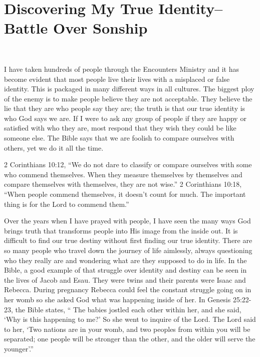 \documentclass[oneside]{book}
\begin{document}
\chapter{Discovering My True Identity--Battle Over Sonship}
\

I have taken hundreds of people through the Encounters Ministry and it has become evident that most people live their lives with a misplaced or false identity. This is packaged in many different ways in all cultures. The biggest ploy of the enemy is to make people believe they are not acceptable. They believe the lie that they are who people say they are; the truth is that our true identity is who God says we are. If I were to ask any group of people if they are happy or satisfied with who they are, most respond that they wish they could be like someone else. The Bible says that we are foolish to compare ourselves with others, yet we do it all the time.

2 Corinthians 10:12, “We do not dare to classify or compare ourselves with some who commend themselves. When they measure themselves by themselves and compare themselves with themselves, they are not wise.”
2 Corinthians 10:18, “When people commend themselves, it doesn't count for much. The important thing is for the Lord to commend them.”

Over the years when I have prayed with people, I have seen the many ways God brings truth that transforms people into His image from the inside out. It is difficult to find our true destiny without first finding our true identity. There are so many people who travel down the journey of life aimlessly, always questioning who they really are and wondering what are they supposed to do in life. In the Bible, a good example of that struggle over identity and destiny can be seen in the lives of Jacob and Esau. They were twins and their parents were Isaac and Rebecca. During pregnancy Rebecca could feel the constant struggle going on in her womb so she asked God what was happening inside of her. In Genesis 25:22-23, the Bible states, “ The babies jostled each other within her, and she said, ‘Why is this happening to me?’ So she went to inquire of the Lord. The Lord said to her, ‘Two nations are in your womb, and two peoples from within you will be separated; one people will be stronger than the other, and the older will serve the younger’.”
\end{document}
